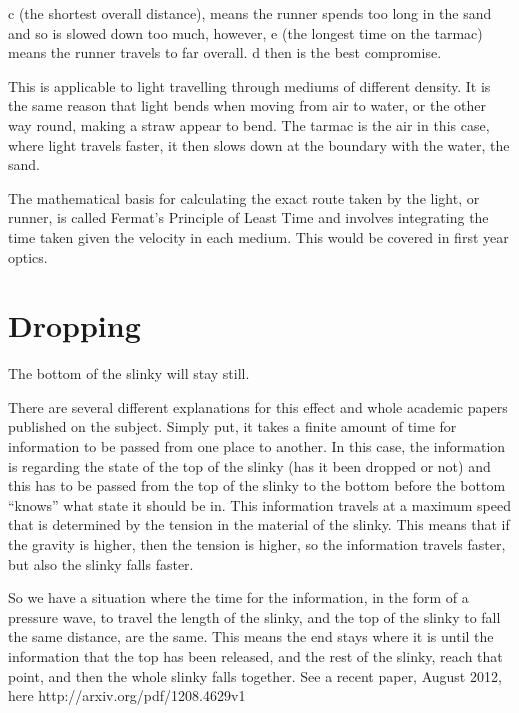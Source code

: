 c (the shortest overall distance), means the runner spends too long in the sand and so is slowed down too much, however, e (the longest time on the tarmac) means the runner travels to far overall. d then is the best compromise.

This is applicable to light travelling through mediums of different density. It is the same reason that light bends when moving from air to water, or the other way round, making a straw appear to bend. The tarmac is the air in this case, where light travels faster, it then slows down at the boundary with the water, the sand.

The mathematical basis for calculating the exact route taken by the light, or runner, is called Fermat's Principle of Least Time and involves integrating the time taken given the velocity in each medium. This would be covered in first year optics.

\section{Dropping}
The bottom of the slinky will stay still. 

There are several different explanations for this effect and whole academic papers published on the subject. Simply put, it takes a finite amount of time for information to be passed from one place to another. In this case, the information is regarding the state of the top of the slinky (has it been dropped or not) and this has to be passed from the top of the slinky to the bottom before the bottom ``knows'' what state it should be in. This information travels at a maximum speed that is determined by the tension in the material of the slinky. This means that if the gravity is higher, then the tension is higher, so the information travels faster, but also the slinky falls faster.

So we have a situation where the time for the information, in the form of a pressure wave, to travel the length of the slinky, and the top of the slinky to fall the same distance, are the same. This means the end stays where it is until the information that the top has been released, and the rest of the slinky, reach that point, and then the whole slinky falls together. See a recent paper, August 2012, here http://arxiv.org/pdf/1208.4629v1

